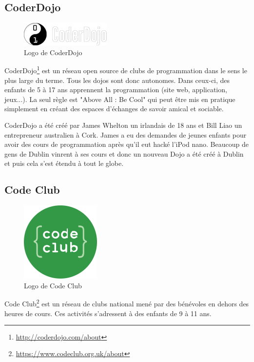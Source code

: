 \subsection{CoderDojo}
\begin{figure}[!h]
  \begin{center}
    \includegraphics[scale=0.5]{content/5-related_work/images/dojo}
    \caption{Logo de CoderDojo}
    \label{fig:coder dojo}
  \end{center}
\end{figure}
CoderDojo\footnote{\url{http://coderdojo.com/about}} est un réseau open source de clubs de programmation dans le sens le plus large du terme. Tous les dojos sont donc autonomes. Dans ceux-ci, des enfants de 5 à 17 ans apprennent la programmation (site web, application, jeux...). La seul règle est "Above All : Be Cool" qui peut être mis en pratique simplement en créant des espaces d'échanges de savoir amical et sociable.

CoderDojo a été créé par James Whelton un irlandais de 18 ans et Bill Liao un entrepreneur australien à Cork. James a eu des demandes de jeunes enfants pour avoir des cours de programmation après qu'il eut hacké l'iPod nano. Beaucoup de gens de Dublin vinrent à ses cours et donc un nouveau Dojo a été créé à Dublin et puis cela s'est étendu à tout le globe.

\subsection{Code Club}
\begin{figure}[!h]
  \begin{center}
    \includegraphics[scale=0.3]{content/5-related_work/images/club}
    \caption{Logo de Code Club}
    \label{fig:code club}
  \end{center}
\end{figure}
Code Club\footnote{\url{https://www.codeclub.org.uk/about}} est un réseau de clubs national mené par des bénévoles en dehors des heures de cours. Ces activités s'adressent à des enfants de 9 à 11 ans.

